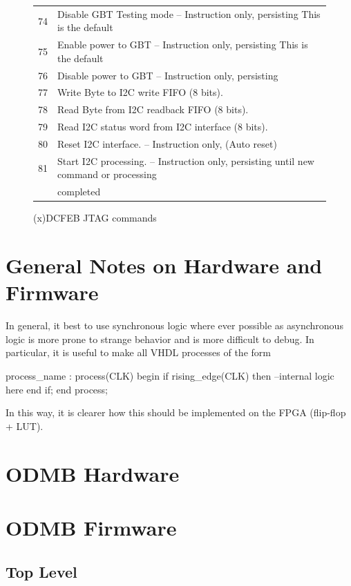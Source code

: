 \documentclass[10pt,a4paper]{article}
\begin{document}
\begin{figure}[H]
{\begin{tabular}{|l|l|}
  74     & Disable GBT Testing mode -- Instruction only, persisting  This is the default \\
  75     & Enable power to GBT -- Instruction only, persisting  This is the default \\ 
  76     & Disable power to GBT -- Instruction only, persisting \\
  77     & Write Byte to I2C write FIFO (8 bits). \\
  78     & Read Byte from I2C readback FIFO (8 bits). \\
  79     & Read I2C status word from I2C interface (8 bits). \\
  80     & Reset I2C interface. -- Instruction only, (Auto reset) \\
  81     & Start I2C processing. -- Instruction only, persisting until new command or processing \\
	       & completed \\ \hline
\end{tabular}}
\caption{(x)DCFEB JTAG commands}
\label{tab:dcfebcommands2}
\end{figure}

\section{General Notes on Hardware and Firmware}

In general, it best to use synchronous logic where ever possible as asynchronous logic is more prone to strange behavior and is more difficult to debug. In particular, it is useful to make all VHDL processes of the form

\begin{listing}
process_name : process(CLK)
begin
if rising_edge(CLK) then
  --internal logic here
end if;
end process;
\end{listing}

In this way, it is clearer how this should be implemented on the FPGA (flip-flop + LUT).

\section{ODMB Hardware}

\section{ODMB Firmware}

\subsection{Top Level}
\end{document}
